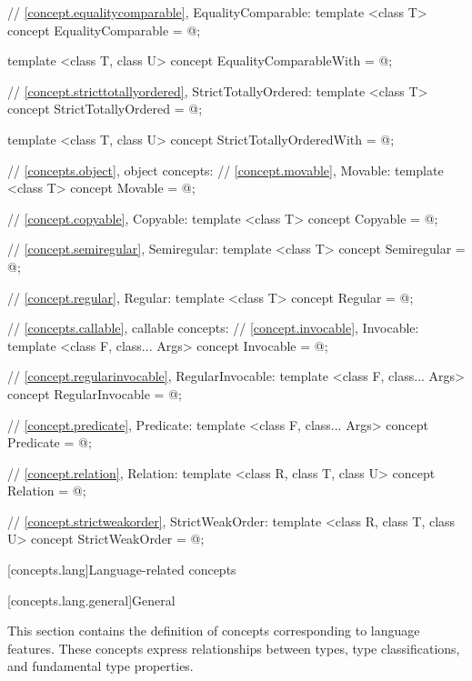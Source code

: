 \begin{codeblock}
{  // \ref{concept.equalitycomparable}, EqualityComparable:
  template <class T>
  concept EqualityComparable = @\seebelow@;

  template <class T, class U>
  concept EqualityComparableWith = @\seebelow@;

  // \ref{concept.stricttotallyordered}, StrictTotallyOrdered:
  template <class T>
  concept StrictTotallyOrdered = @\seebelow@;

  template <class T, class U>
  concept StrictTotallyOrderedWith = @\seebelow@;

  // \ref{concepts.object}, object concepts:
  // \ref{concept.movable}, Movable:
  template <class T>
  concept Movable = @\seebelow@;

  // \ref{concept.copyable}, Copyable:
  template <class T>
  concept Copyable = @\seebelow@;

  // \ref{concept.semiregular}, Semiregular:
  template <class T>
  concept Semiregular = @\seebelow@;

  // \ref{concept.regular}, Regular:
  template <class T>
  concept Regular = @\seebelow@;

  // \ref{concepts.callable}, callable concepts:
  // \ref{concept.invocable}, Invocable:
  template <class F, class... Args>
  concept Invocable = @\seebelow@;

  // \ref{concept.regularinvocable}, RegularInvocable:
  template <class F, class... Args>
  concept RegularInvocable = @\seebelow@;

  // \ref{concept.predicate}, Predicate:
  template <class F, class... Args>
  concept Predicate = @\seebelow@;

  // \ref{concept.relation}, Relation:
  template <class R, class T, class U>
  concept Relation = @\seebelow@;

  // \ref{concept.strictweakorder}, StrictWeakOrder:
  template <class R, class T, class U>
  concept StrictWeakOrder = @\seebelow@;
}
\end{codeblock}

[concepts.lang]{Language-related concepts}

[concepts.lang.general]{General}

\pnum
This section contains the definition of concepts corresponding to language
features. These concepts express relationships between types, type
classifications, and fundamental type properties.

